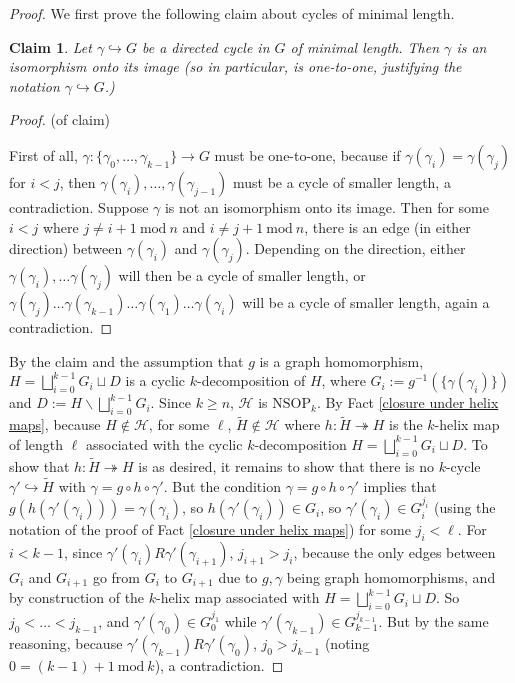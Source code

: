 \documentclass{amsart}
\newtheorem{claim}[theorem]{Claim}
\theoremstyle{definition}
\theoremstyle{remark}
\numberwithin{equation}{section}
\begin{document}
\begin{proof}
    We first prove the following claim about cycles of minimal length.

    \begin{claim}\label{minimal length cycles}
        Let $\gamma \hookrightarrow G$ be a directed cycle in $G$ of minimal length. Then $\gamma$ is an isomorphism onto its image (so in particular, is one-to-one, justifying the notation $\gamma \hookrightarrow G$.)
    \end{claim}
\begin{proof} (of claim)

First of all, $\gamma: \{\gamma_{0}, \ldots, \gamma_{k-1}\} \to G$ must be one-to-one, because if $\gamma(\gamma_{i}) = \gamma(\gamma_{j})$ for $i < j$, then $\gamma(\gamma_{i}), \ldots, \gamma(\gamma_{j-1})$ must be a cycle of smaller length, a contradiction. Suppose $\gamma$ is not an isomorphism onto its image. Then for some $i < j$ where $j \neq i+1 \mathrm{\: mod \:} n$ and $i \neq j+1 \mathrm{\: mod \:} n$, there is an edge (in either direction) between $\gamma(\gamma_{i})$ and  $\gamma(\gamma_{j})$. Depending on the direction, either $\gamma(\gamma_{i}), \ldots \gamma(\gamma_{j})$ will then be a cycle of smaller length, or $\gamma(\gamma_{j}) \ldots \gamma(\gamma_{k-1}) \ldots \gamma(\gamma_{1}) \ldots \gamma(\gamma_{i})$ will be a cycle of smaller length, again a contradiction.
    
\end{proof}
    


By the claim and the assumption that $g$ is a graph homomorphism, $H = \bigsqcup^{k-1}_{i =0} G_{i} \sqcup D$ is a cyclic $k$-decomposition of $H$, where $G_{i} := g^{-1}(\{\gamma(\gamma_{i})\})$ and $D := H \backslash \bigsqcup^{k-1}_{i =0} G_{i}  $. Since $k \geq n$, $\mathcal{H}$ is $\mathrm{NSOP}_{k}$. By Fact \ref{closure under helix maps}, because $H \notin \mathcal{H}$, for some $\ell$, $\tilde{H} \notin \mathcal{H}$ where $h : \tilde{H} \twoheadrightarrow H$ is the $k$-helix map of length $\ell$ associated with the cyclic $k$-decomposition $H = \bigsqcup^{k-1}_{i =0} G_{i} \sqcup D$. To show that $h : \tilde{H} \twoheadrightarrow H$ is as desired, it remains to show that there is no $k$-cycle $\gamma' \hookrightarrow \tilde{H}$ with $\gamma = g\circ h\circ \gamma'$. But the condition $\gamma = g\circ h\circ \gamma'$ implies that $g(h(\gamma'(\gamma_{i})))= \gamma(\gamma_{i})$, so $h(\gamma'(\gamma_{i})) \in G_{i}$, so $\gamma'(\gamma_{i}) \in G^{j_{i}}_{i}$ (using the notation of the proof of Fact \ref{closure under helix maps}) for some $j_{i} < \ell$. For $i < k-1$, since $\gamma'(\gamma_{i}) R \gamma'(\gamma_{i+1})$, $j_{i+1} > j_{i}$, because the only edges between $G_{i}$ and $G_{i+1}$ go from $G_{i}$ to $G_{i+1}$ due to $g, \gamma$ being graph homomorphisms, and by construction of the $k$-helix map associated with $H = \bigsqcup^{k-1}_{i =0} G_{i} \sqcup D$. So $j_{0} < \ldots < j_{k-1}$, and $\gamma'(\gamma_{0}) \in G^{j_{1}}_{0}$ while $\gamma'(\gamma_{k-1}) \in G^{j_{k-1}}_{k-1}$. But by the same reasoning, because $\gamma'(\gamma_{k-1}) R \gamma'(\gamma_{0})$, $j_{0} > j_{k-1}$ (noting $0 = (k-1)+1 \mathrm{\: mod \:} k$), a contradiction. 


\end{proof}
\end{document}

